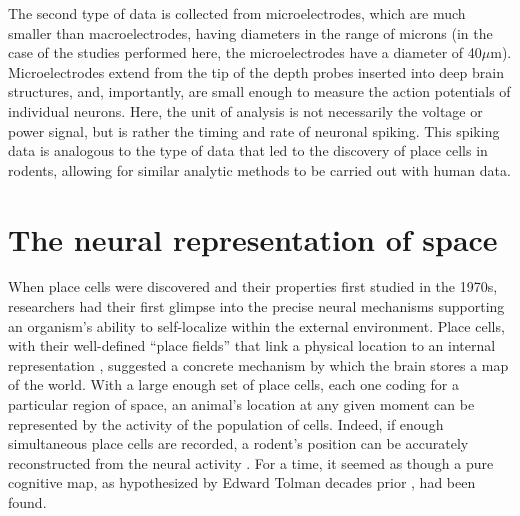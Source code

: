The second type of data is collected from microelectrodes, which are much smaller than macroelectrodes, having diameters in the range of microns (in the case of the studies performed here, the microelectrodes have a diameter of 40$\mu$m). Microelectrodes extend from the tip of the depth probes inserted into deep brain structures, and, importantly, are small enough to measure the action potentials of individual neurons. Here, the unit of analysis is not necessarily the voltage or power signal, but is rather the timing and rate of neuronal spiking. This spiking data is analogous to the type of data that led to the discovery of place cells in rodents, allowing for similar analytic methods to be carried out with human data. 



\section{The neural representation of space}


When place cells were discovered and their properties first studied in the 1970s, researchers had their first glimpse into the precise neural mechanisms supporting an organism's ability to self-localize within the external environment. Place cells, with their well-defined ``place fields'' that link a physical location to an internal representation \citep{OKeeNade78}, suggested a  concrete mechanism by which the brain stores a map of the world. With a large enough set of place cells, each one coding for a particular region of space, an animal's location at any given moment can be represented by the activity of the population of cells. Indeed, if enough simultaneous place cells are recorded, a rodent's position can be accurately reconstructed from the neural activity \citep{WilsMcNa93,ZhanEtal98}. For a time, it seemed as though a pure cognitive map, as hypothesized by Edward Tolman decades prior \citep{Tolm48}, had been found.

